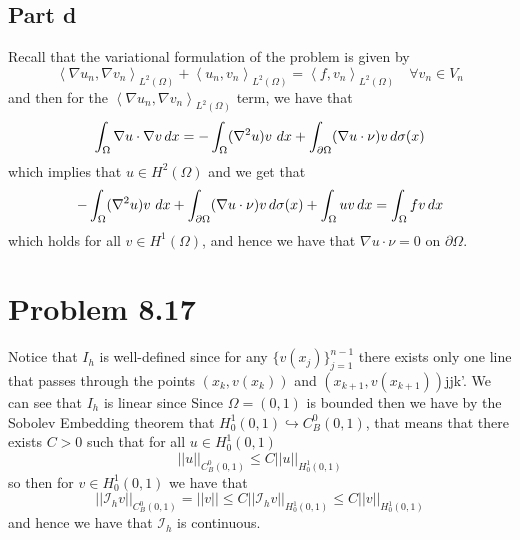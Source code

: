 \documentclass[12pt]{report}
\newcommand{\norm}[1]{\left|\left|#1\right|\right|}
\newcommand{\inner}[2]{\left\langle#1,#2\right\rangle}
\begin{document}
\subsection*{Part d}
Recall that the variational formulation of the problem is given by
\begin{equation*}
  \inner{\nabla u_n}{\nabla v_n}_{L^2(\Omega)} + \inner{u_n}{v_n}_{L^2(\Omega)} = \inner{f}{v_n}_{L^2(\Omega)} \quad \forall v_n \in V_n
\end{equation*}
and then for the $\inner{\nabla u_n}{\nabla v_n}_{L^2(\Omega)}$ term, we have that 
\begin{equation*}
  \int_{\Omega} \nabla u \cdot \nabla v \, dx = - \int_{\Omega} (\nabla^2 u)v \, \,dx + \int_{\partial \Omega}(\nabla u \cdot \nu)v \, d\sigma(x)
\end{equation*}
which implies that $u \in H^2(\Omega)$ and we get that
\begin{equation*}
  - \int_{\Omega} (\nabla^2 u)v \, \,dx + \int_{\partial \Omega}(\nabla u \cdot \nu)v \, d\sigma(x) + \int_{\Omega} uv \, dx = \int_{\Omega} fv \, dx 
\end{equation*}
which holds for all $v \in H^1(\Omega)$, and hence we have that $\nabla u \cdot \nu = 0$ on $\partial \Omega$.

\section*{Problem 8.17}
Notice that $I_h$ is well-defined since for any $\{v(x_j)\}_{j=1}^{n-1}$ there exists only one line that passes through the points $(x_k, v(x_k))$ and $(x_{k+1},v(x_{k+1}))$jjk'. We can see that $I_h$ is linear since
Since $\Omega = (0,1)$ is bounded then we have by the Sobolev Embedding theorem that $H_0^1(0,1) \hookrightarrow C_B^0(0,1)$, that means that there exists $C > 0$ such that for all $u \in H_0^1(0,1)$
\begin{equation*}
  \norm{u}_{C_B^0(0,1)} \leq C \norm{u}_{H_0^1(0,1)}
\end{equation*}
so then for $v \in H_0^1(0,1)$ we have that 
\begin{equation*}
  \norm{\mathcal{I}_h v}_{C_B^0(0,1)} = \norm{v}\leq C \norm{\mathcal{I}_h v}_{H_0^1(0,1)} \leq C \norm{v}_{H_0^1(0,1)}
\end{equation*}
and hence we have that $\mathcal{I}_h$ is continuous.
\end{document}
